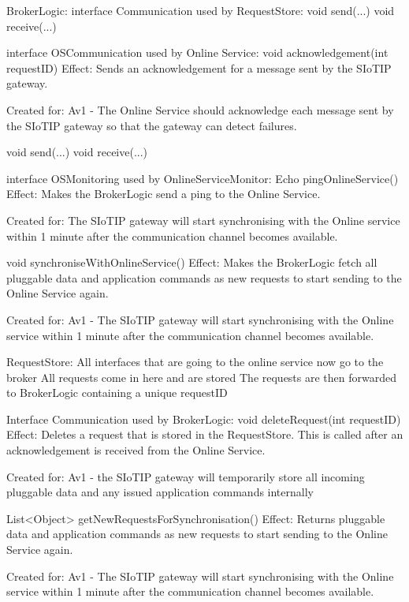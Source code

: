             BrokerLogic:
                interface Communication used by RequestStore:
                    void send(...)
                    void receive(...)

                interface OSCommunication used by Online Service:
                    void acknowledgement(int requestID)
                        Effect: Sends an acknowledgement for a message sent by the SIoTIP gateway.
                        \item Created for: Av1 - The Online Service should acknowledge each message sent by the SIoTIP gateway so that the gateway can detect failures.

                    void send(...)
                    void receive(...)

                interface OSMonitoring used by OnlineServiceMonitor:
                    Echo pingOnlineService()
                        Effect: Makes the BrokerLogic send a ping to the Online Service.
                        \item Created for: The SIoTIP gateway will start synchronising with the Online service within 1 minute after the communication channel becomes available.

                    void synchroniseWithOnlineService()
                        Effect: Makes the BrokerLogic fetch all pluggable data and application commands as new requests to start sending to the Online Service again.
                        \item Created for: Av1 - The SIoTIP gateway will start synchronising with the Online service within 1 minute after the communication channel becomes available.

            RequestStore:
                All interfaces that are going to the online service now go to the broker
                All requests come in here and are stored
                The requests are then forwarded to BrokerLogic containing a unique requestID

                Interface Communication used by BrokerLogic:
                    void deleteRequest(int requestID)
                        Effect: Deletes a request that is stored in the RequestStore. This is called after an acknowledgement is received from the Online Service.
                        \item Created for: Av1 - the SIoTIP gateway will temporarily store all incoming pluggable data and any issued application commands internally

                    List<Object> getNewRequestsForSynchronisation()
                        Effect: Returns pluggable data and application commands as new requests to start sending to the Online Service again.
                        \item Created for: Av1 - The SIoTIP gateway will start synchronising with the Online service within 1 minute after the communication channel becomes available.

